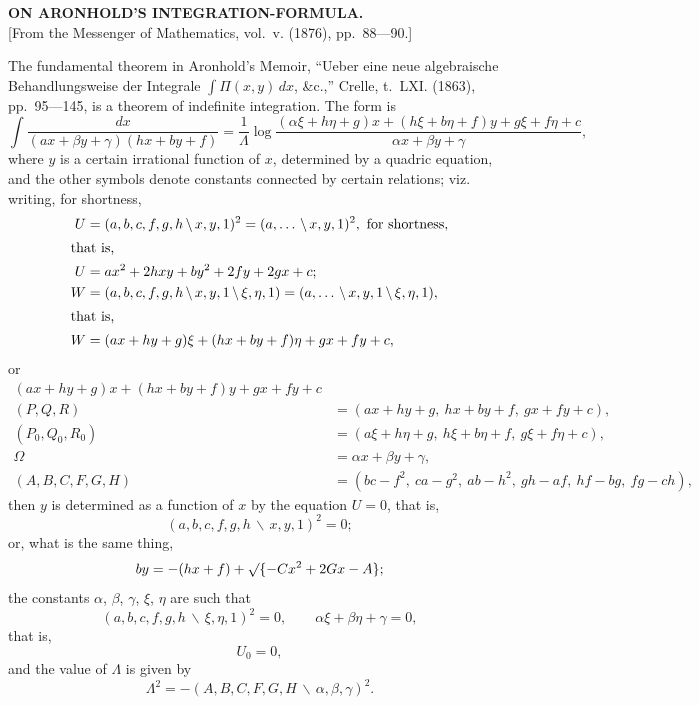 \documentclass[12pt,a4paper]{article}
\theoremstyle{plain}
\theoremstyle{definition}
\theoremstyle{remark}
\begin{document}
\begin{center}
\textbf{ON ARONHOLD'S INTEGRATION-FORMULA.}\\[1em]
[From the Messenger of Mathematics, vol.~v. (1876), pp.~88---90.]
\end{center}

The fundamental theorem in Aronhold's Memoir, ``Ueber eine neue algebraische Behandlungsweise der Integrale $\int \Pi(x, y)\, dx$, \&c.,'' Crelle, t.~LXI. (1863), pp.~95---145, is a theorem of indefinite integration. The form is
\[
\int \frac{dx}{(ax + \beta y + \gamma)(hx + by + f)} = \frac{1}{\Lambda} \log \frac{(\alpha\xi + h\eta + g)x + (h\xi + b\eta + f)y + g\xi + f\eta + c}{\alpha x + \beta y + \gamma},
\]
where $y$ is a certain irrational function of $x$, determined by a quadric equation, and the other symbols denote constants connected by certain relations; viz. writing, for shortness,
\begin{align*}
U &= (a, b, c, f, g, h \,\backslash\, x, y, 1)^2 = (a, \ldots \,\backslash\, x, y, 1)^2, \text{ for shortness}, \\
\intertext{that is,}
U &= ax^2 + 2hxy + by^2 + 2fy + 2gx + c; \\
W &= (a, b, c, f, g, h \,\backslash\, x, y, 1 \,\backslash\, \xi, \eta, 1) = (a, \ldots \,\backslash\, x, y, 1 \,\backslash\, \xi, \eta, 1), \\
\intertext{that is,}
W &= (ax + hy + g)\xi + (hx + by + f)\eta + gx + fy + c,
\end{align*}
or
\begin{align*}
(ax + hy + g)x + (hx + by + f)y + gx + fy + c \\
(P, Q, R) &= (ax + hy + g,\ hx + by + f,\ gx + fy + c), \\
(P_0, Q_0, R_0) &= (a\xi + h\eta + g,\ h\xi + b\eta + f,\ g\xi + f\eta + c), \\
\Omega &= \alpha x + \beta y + \gamma, \\
(A, B, C, F, G, H) &= (bc - f^2,\ ca - g^2,\ ab - h^2,\ gh - af,\ hf - bg,\ fg - ch),
\end{align*}
then $y$ is determined as a function of $x$ by the equation $U = 0$, that is,
\[
(a, b, c, f, g, h \,\backslash\, x, y, 1)^2 = 0;
\]
or, what is the same thing,
\[
by = -(hx + f) + \surd\{-Cx^2 + 2Gx - A\};
\]
the constants $\alpha$, $\beta$, $\gamma$, $\xi$, $\eta$ are such that
\[
(a, b, c, f, g, h \,\backslash\, \xi, \eta, 1)^2 = 0, \qquad \alpha\xi + \beta\eta + \gamma = 0,
\]
that is,
\[
U_0 = 0,
\]
and the value of $\Lambda$ is given by
\[
\Lambda^2 = -(A, B, C, F, G, H \,\backslash\, \alpha, \beta, \gamma)^2.
\]
\end{document}
